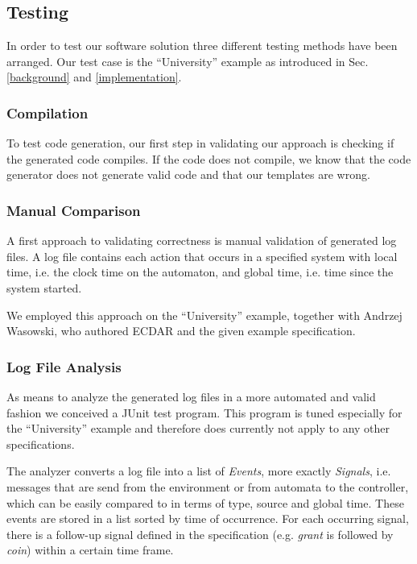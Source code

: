 \subsection{Testing}
\label{Testing}
In order to test our software solution three different testing methods have been
arranged. Our test case is the ``University'' example as introduced in
Sec. \ref{background} and \ref{implementation}.


\subsubsection{Compilation}

To test code generation, our first step in validating our approach is checking
if the generated code compiles. If the code does not compile, we know that the
code generator does not generate valid code and that our templates are wrong.


\subsubsection{Manual Comparison}

A first approach to validating correctness is manual validation of generated log
files. A log file contains each action that occurs in a specified system with
local time, i.e. the clock time on the automaton, and global time, i.e. time
since the system started.

We employed this approach on the ``University'' example, together with Andrzej
Wasowski, who authored ECDAR and the given example specification.

\subsubsection{Log File Analysis}

As means to analyze the generated log files in a more automated and valid
fashion we conceived a JUnit test program. This program is tuned especially for
the ``University'' example and therefore does currently not apply to any other
specifications.

The analyzer converts a log file into a list of \textit{Events}, more exactly
\textit{Signals}, i.e. messages that are send from the environment or from automata
to the controller, which can be easily compared to in terms of type, source and
global time. These events are stored in a list sorted by time of occurrence. For
each occurring signal, there is a follow-up signal defined in the specification
(e.g. \emph{grant} is followed by \emph{coin}) within a certain time frame.

